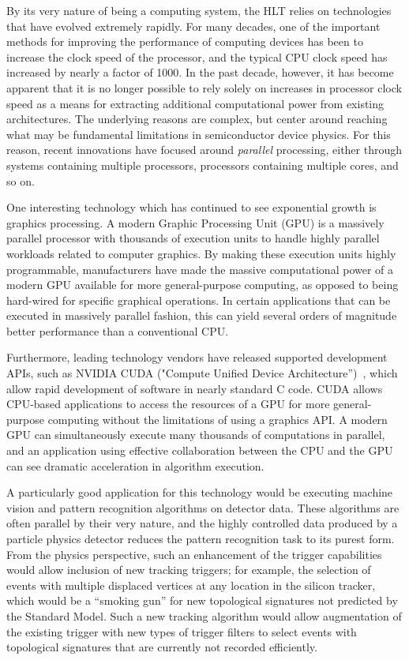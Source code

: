 \documentclass{JINST}
\begin{document}
By its very nature of being a computing system, the HLT relies on technologies that have evolved
extremely rapidly.  For many decades, one of the important methods for improving the performance of computing devices
has been to increase the clock speed of the processor, and the typical CPU clock speed has increased by nearly a factor of 1000.
In the past decade, however, it has become apparent that it is no longer possible to rely solely on increases
in processor clock speed as a means for extracting additional computational power from existing architectures.
The underlying reasons are complex, but center around reaching what may be fundamental limitations in
semiconductor device physics.  For this reason, recent innovations have focused around {\em parallel}
processing, either through systems containing multiple processors, processors containing multiple cores, and so on.

One interesting technology which has continued to see exponential growth is graphics processing.  
A modern Graphic Processing Unit (GPU) is a massively parallel processor with thousands of execution units to handle highly parallel workloads
related to computer graphics.  By making these execution units highly programmable, manufacturers have made
the massive computational power of a modern GPU available for more general-purpose computing,
as opposed to being hard-wired for specific graphical operations.  In certain applications that can be executed in massively parallel
 fashion, this can yield several orders of magnitude better performance than a conventional CPU.

Furthermore, leading technology vendors have released supported development APIs, such as NVIDIA
CUDA ("Compute Unified Device Architecture'')~\cite{bib:CUDA}, which allow rapid development of
software in nearly standard C code. CUDA allows CPU-based applications to access the resources of a GPU 
for more general-purpose computing without the limitations of using a graphics API.
 A modern GPU can simultaneously execute many thousands of computations in parallel, and an application using 
effective collaboration between the CPU and the GPU can see dramatic acceleration in algorithm execution.

A particularly good application for this technology would be executing machine vision
and pattern recognition algorithms on detector data. These algorithms are often parallel
by their very nature, and the highly controlled data produced by a particle physics detector
reduces the pattern recognition task to its purest form.  From the physics perspective,
such an enhancement of the trigger capabilities would allow inclusion of new tracking triggers;
for example, the selection of events with multiple displaced
vertices at any location in the silicon tracker, which would be a ``smoking gun'' for new topological
signatures not predicted by the Standard Model. Such a new tracking algorithm would allow
augmentation of the existing trigger with new types of trigger filters to select events with topological signatures
that are currently not recorded efficiently.
\end{document}
